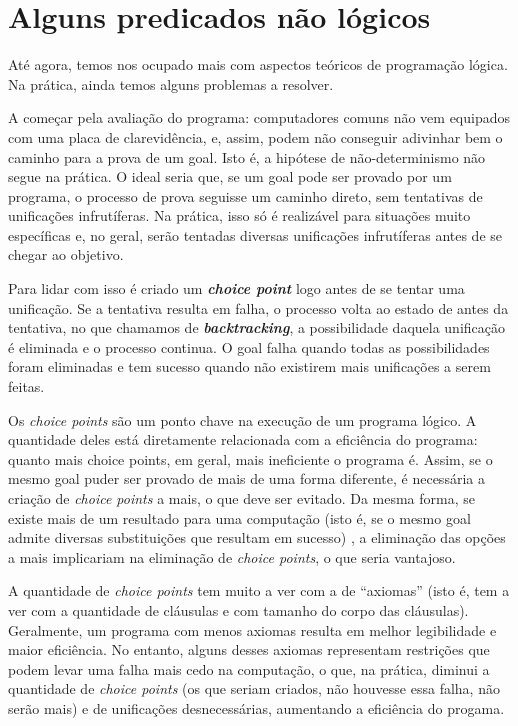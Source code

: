 \documentclass{article}
\theoremstyle{remark}
\begin{document}
\section{Alguns predicados não lógicos}

Até agora, temos nos ocupado mais com aspectos teóricos de programação lógica. Na prática, ainda temos alguns problemas a resolver.

A começar pela avaliação do programa: computadores comuns não vem equipados com uma placa de clarevidência, e, assim, podem não conseguir adivinhar bem o caminho para a prova de um goal. Isto é, a hipótese de não-determinismo não segue na prática. O ideal seria que, se um goal pode ser provado por um programa, o processo de prova seguisse um caminho direto, sem tentativas de unificações infrutíferas. Na prática, isso só é realizável para situações muito específicas e, no geral, serão tentadas
diversas unificações infrutíferas antes de se chegar ao objetivo.

Para lidar com isso é criado um \textbf{\textit{choice point}} logo antes de se tentar uma unificação. Se a tentativa resulta em falha, o processo volta ao estado de antes da tentativa, no que chamamos de \textbf\textit{{backtracking}}, a possibilidade daquela unificação é eliminada e o processo continua. O goal falha quando todas as possibilidades foram eliminadas e tem sucesso quando não existirem mais unificações a serem feitas.

Os \textit{choice points} são um ponto chave na execução de um programa lógico. A quantidade deles está diretamente relacionada com a eficiência do programa: quanto mais choice points, em geral, mais ineficiente o programa é. Assim, se o mesmo goal puder ser provado de mais de uma forma diferente, é necessária a criação de \textit{choice points} a mais, o que deve ser evitado. Da mesma forma, se existe mais de um resultado para uma computação (isto é, se o mesmo goal admite
diversas substituições que resultam em sucesso)
, a eliminação das opções a mais implicariam na eliminação de \textit{choice points}, o que seria vantajoso.

A quantidade de \textit{choice points} tem muito a ver com a de ``axiomas'' (isto é, tem a ver com a quantidade de cláusulas e com tamanho do corpo das cláusulas). Geralmente, um programa com menos axiomas resulta em melhor legibilidade e maior eficiência. No entanto, alguns desses axiomas representam restrições que podem levar uma falha mais cedo na computação, o que, na prática, diminui a quantidade de \textit{choice points} (os que seriam criados, não houvesse essa
falha, não serão mais) e de unificações
desnecessárias, aumentando a eficiência do progama.
\end{document}
